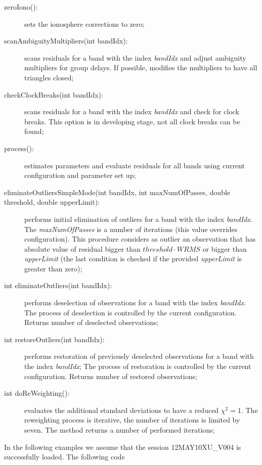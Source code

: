 \documentclass [10pt,letterpaper]{report}
\begin{document}
\begin{description}
\item[zeroIono():] sets the ionosphere corrections to zero;

\item[scanAmbiguityMultipliers(int bandIdx):] scans residuals for a band with the index {\sl bandIdx} and adjust
ambiguity multipliers for group delays. If possible, modifies the multipliers to have all triangles closed;

\item[checkClockBreaks(int bandIdx):] scans residuals for a band with the index {\sl bandIdx} and check for
clock breaks. This option is in developing stage, not all clock breaks can be found;

\item[process():] estimates parameters and evaluate residuals for all bands using current configuration and parameter set up;

\item[eliminateOutliersSimpleMode(int bandIdx, int maxNumOfPasses, double threshold, double upperLimit):] performs initial
elimination of outliers for a band with the index {\sl bandIdx}. The {\sl maxNumOfPasses} is a number of iterations (this value
overrides configuration). This procedure considers as outlier an observation that has absolute value of residual bigger than
$threshold\cdot WRMS$ or bigger than {\sl upperLimit} (the last condition is checked if the provided {\sl upperLimit} is greater
than zero);

\item[int eliminateOutliers(int bandIdx):] performs deselection of observations for a band with the index {\sl bandIdx}. The
process of deselection is controlled by the current configuration. Returns number of deselected observations;

\item[int restoreOutliers(int bandIdx):] performs restoration of previously deselected observations for a band with the
index {\sl bandIdx}; The process of restoration is controlled by the current configuration. Returns number of restored
observations;

\item[int doReWeighting():] evaluates the additional standard deviations to have a reduced $\chi^2=1$. The reweighting process is
iterative, the number of iterations is limited by seven. The method returns a number of performed iterations;
\end{description}
\noindent
In the following examples we assume that the session 12MAY10XU\_V004 is successfully loaded. The following code
\end{document}
